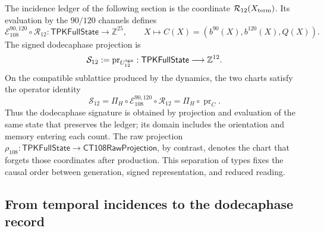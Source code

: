 The incidence ledger of the following section is the coordinate
\(\mathcal R_{12}(X_{\rm term})\). Its evaluation by the
\(90/120\) channels defines
\[
 \mathcal E_{108}^{90,120}\circ\mathcal R_{12}:
 \mathsf{TPKFullState}\longrightarrow\mathbb Z^{25},
 \qquad
 X\longmapsto C(X)=(b^{90}(X),b^{120}(X),Q(X)).
\]
The signed dodecaphase projection is
\[
 \mathcal S_{12}:=\operatorname{pr}_{U_{12}^{\rm sgn}}:
 \mathsf{TPKFullState}\longrightarrow\mathbb Z^{12}.
\]
On the compatible sublattice produced by the dynamics, the two charts
satisfy the operator identity
\begin{equation}
 \mathcal S_{12}
 =\Pi_H\circ\mathcal E_{108}^{90,120}\circ\mathcal R_{12}
 =\Pi_H\circ\operatorname{pr}_{C}.
 \label{vi:dep:identidad-productor-e108}
\end{equation}
Thus the dodecaphase signature is obtained by projection and evaluation of the same
state that preserves the ledger; its domain includes the orientation and memory
entering each count. The raw projection
\(\rho_{108}:\mathsf{TPKFullState}\to\mathsf{CT108RawProjection}\),
by contrast, denotes the chart that forgets those coordinates after
production. This separation of types fixes the causal order between generation,
signed representation, and reduced reading.

\subsection{From temporal incidences to the dodecaphase record}
\label{vi:dep:registro}

